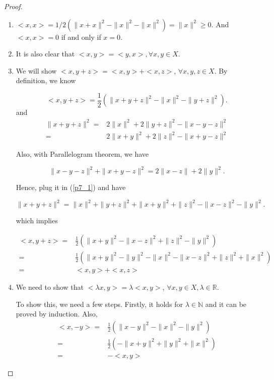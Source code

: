 \documentclass[12pt]{article}
\begin{document}
\begin{proof}

\begin{enumerate}
\item

$<x,x> = 1/2(\|x+x\|^2 - \|x\|^2 - \|x\|^2) = \|x\|^2 \geqslant 0$. And $<x,x> = 0$ if and only if $x = 0$.

\item 

It is also clear that $<x, y> = <y, x>, \forall x, y \in X$.

\item
We will show $<x, y+z> = <x, y>+<x, z>$, $\forall x, y, z\in X$. By definition, we know

$$
<x, y+z> = \frac{1}{2} (\|x+y+z\|^2 - \|x\|^2 - \|y+z\|^2).
$$
and 
\begin{equation}\label{p7_1}
\begin{aligned}
\|x+y+z\|^2 = & 2\|x\|^2 + 2\|y+z\|^2 - \|x-y-z\|^2 \\
 = & 2\|x+y\|^2 + 2\|z\|^2 - \|x+y-z\|^2
\end{aligned}
\end{equation}

Also, with Parallelogram theorem, we have 

$$
\|x-y-z\|^2 + \|x+y-z\|^2 = 2\|x - z\| + 2\|y\|^2.
$$

Hence, plug it in (\ref{p7_1}) and have 

$$
\|x+y+z\|^2 = \|x\|^2 + \|y+z\|^2 + \|x+y\|^2 + \|z\|^2 - \|x - z\|^2 - \|y\|^2.
$$

which implies

$$
\begin{aligned}
<x, y+z> =& \frac{1}{2} (\|x + y\|^2 - \|x - z\|^2 + \|z\|^2 - \|y\|^2) \\
=& \frac{1}{2} (\|x + y\|^2 - \|y\|^2 - \|x\|^2 - \|x - z\|^2 + \|z\|^2 + \|x\|^2 )\\
 =& <x, y> + <x, z>
\end{aligned}
$$

\item

We need to show that $<\lambda x, y> = \lambda<x, y>$, $\forall x, y\in X, \lambda \in \mathbb R$.

To show this, we need a few steps. Firstly, it holds for $\lambda\in \mathbb N$ and it can be proved by induction. Also, 
$$
\begin{aligned}
<x, -y> =& \frac{1}{2} (\|x - y\|^2  - \|x\|^2 - \|y\|^2) \\
=& \frac{1}{2} (-\|x + y\|^2 + \|y\|^2 + \|x\|^2 )\\
 =& -<x, y> 
\end{aligned}
$$ 


\end{enumerate}
\end{proof}
\end{document}
